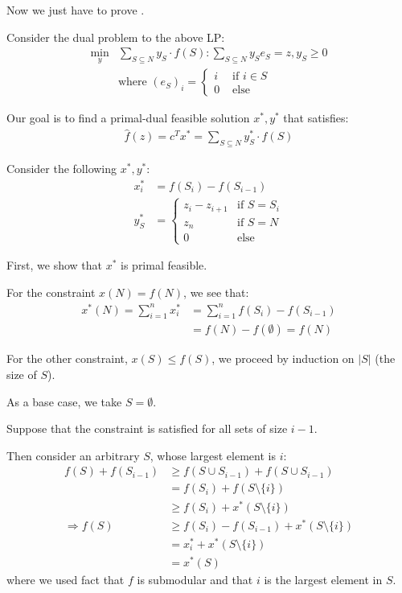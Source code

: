 Now we just have to prove .

Consider the dual problem to the above LP:
\begin{align*}
\min_y & \sum_{S \subseteq N} y_S \cdot f(S) : \sum_{S \subseteq N} y_S e_S = z, y_S \geq 0 \\
& \text{where } (e_S)_i  = \begin{cases} i & \text{ if $i \in S$ } \\ 0 & \text{ else} \end{cases}
\end{align*}

Our goal is to find a primal-dual feasible solution $x^*, y^*$ that satisfies:
\begin{align*}
\hat f(z) = c^T x^* = \sum_{S \subseteq N} y_S^* \cdot f(S)
\end{align*}

Consider the following $x^*, y^*$:
\begin{align*}
x_i^* &= f(S_i) - f(S_{i-1}) \\
y_S^* &= \begin{cases}
z_i - z_{i+1} & \text{if } S = S_i \\
z_n & \text{if } S = N \\
0 & \text{else}
\end{cases}
\end{align*}

First, we show that $x^*$ is primal feasible.

 For the constraint $x(N) = f(N)$, we see that:
\begin{align*}
x^*(N) = \sum_{i=1}^{n} x_i^*
&= \sum_{i=1}^{n} f(S_i) - f(S_{i-1}) \\
&= f(N) - f(\emptyset) = f(N)
\end{align*}

For the other constraint, $x(S) \leq f(S)$, we proceed by induction on $|S|$ (the size of $S$).

As a base case, we take $S = \emptyset$.

Suppose that the constraint is satisfied for all sets of size $i - 1$.

Then consider an arbitrary $S$, whose largest element is $i$:
\begin{align*}
f(S) + f(S_{i-1})
&\geq f(S \cup S_{i-1}) + f(S \cup S_{i-1}) \\
&= f(S_i) + f(S \setminus \{i\}) \\
&\geq f(S_i) + x^*(S \setminus \{i\}) \\
\Rightarrow f(S) 
&\geq f(S_i) - f(S_{i-1}) + x^*(S \setminus \{i\}) \\
&= x_i^* + x^*(S \setminus \{i\}) \\
&= x^*(S)
\end{align*}
where we used fact that $f$ is submodular and that $i$ is the largest element in $S$.

